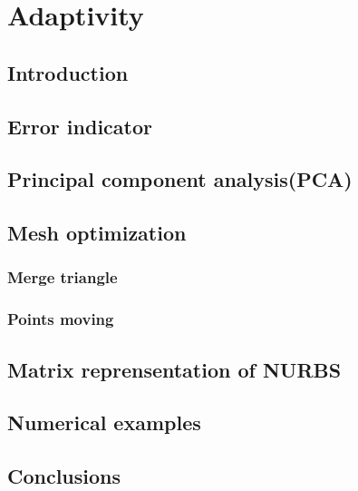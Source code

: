 
\chapter{Adaptivity}

\section{Introduction}

\section{Error indicator}


\section{Principal component analysis(PCA)}

\section{Mesh optimization}

    \subsection{Merge triangle}
        \label{adap_merge_triangle}
        
    \subsection{Points moving}

    \pagebreak

\section{Matrix reprensentation of NURBS}
    \label{adap_sec_mrep2d}
    
    \pagebreak

\section{Numerical examples}

\section{Conclusions}

